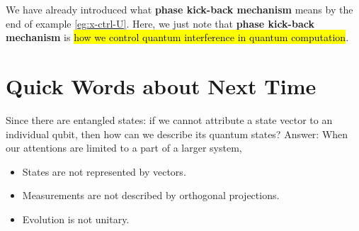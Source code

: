 \documentclass[12pt]{article}
\begin{document}
\begin{definition}
We have already introduced what \textbf{phase kick-back mechanism} means by the end of example \ref{eg:x-ctrl-U}. Here, we just note that \textbf{phase kick-back mechanism} is \hl{how we control quantum interference in quantum computation}.
\end{definition}

\section{Quick Words about Next Time}
Since there are entangled states: if we cannot attribute a state vector to an individual qubit, then how can we describe its quantum states? Answer: When our attentions are limited to a part of a larger system,
\begin{itemize}
    \item States are not represented by vectors.
    \item Measurements are not described by orthogonal projections.
    \item Evolution is not unitary.
\end{itemize}
\end{document}
